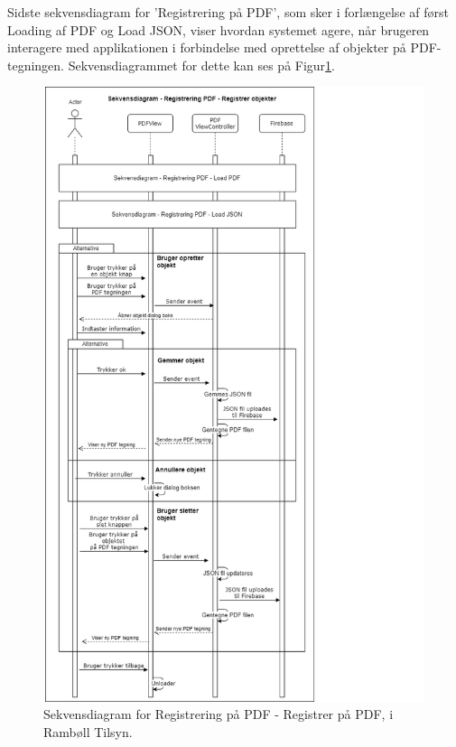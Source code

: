 Sidste sekvensdiagram for 'Registrering på PDF', som sker i forlængelse af først Loading af PDF og Load JSON, viser hvordan systemet agere, når brugeren interagere med applikationen i forbindelse med oprettelse af objekter på PDF-tegningen. Sekvensdiagrammet for dette kan ses på Figur\ref{fig:RegistrerObjekterSekvensDiagram}.
\begin{figure}[H] %
	\centering
	\includegraphics[height=18cm, width=15cm]{Design/Applikation/RegistrePDF/RegistrerObjekterSekvensDiagram}
	\caption{Sekvensdiagram for Registrering på PDF - Registrer på PDF, i Rambøll Tilsyn.}
	\label{fig:RegistrerObjekterSekvensDiagram}
\end{figure}

\clearpage

